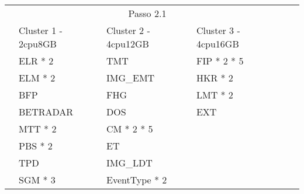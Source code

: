 \begin{table}[H]
  \centering
  \small
  \setlength{\extrarowheight}{3pt}
  \setlength{\arrayrulewidth}{1pt}
  
  \begin{tabular}{|l|l|l|l|l|l|}
    \hline
    \cellcolor{white} & \multicolumn{3}{|c|}{\cellcolor[HTML]{FBE6A3}Passo 2.1} & \cellcolor{white}             & \cellcolor{white}  \\ \cline{2-5} 
                                     & \cellcolor[HTML]{4EAC5B}Cluster 1 - 2cpu8GB & \cellcolor[HTML]{4EAC5B}Cluster 2 - 4cpu12GB & \cellcolor[HTML]{4EAC5B}Cluster 3 - 4cpu16GB &                              & \\ \cline{3-4}
                                     & \cellcolor[HTML]{A9D08E}ELR * 2             & \cellcolor[HTML]{BDD7EE}TMT                & \cellcolor[HTML]{A9D08E}FIP * 2 * 5       &                              & \\ \cline{3-4}
                                     & \cellcolor[HTML]{A9D08E}ELM * 2             & \cellcolor[HTML]{BDD7EE}IMG\_EMT           & \cellcolor[HTML]{A9D08E}HKR * 2           &                              & \\ \cline{3-4}
                                     & \cellcolor[HTML]{A9D08E}BFP                 & \cellcolor[HTML]{BDD7EE}FHG                & \cellcolor[HTML]{BDD7EE}LMT * 2           &                              & \\ \cline{3-4}
                                     & \cellcolor[HTML]{A9D08E}BETRADAR            & \cellcolor[HTML]{BDD7EE}DOS                & \cellcolor[HTML]{BDD7EE}EXT               &                              & \\ \cline{3-4}
                                     & \cellcolor[HTML]{BDD7EE}MTT * 2             & \cellcolor[HTML]{BDD7EE}CM * 2 * 5         &                                           &                              & \\ 
                                     & \cellcolor[HTML]{BDD7EE}PBS * 2             & \cellcolor[HTML]{BDD7EE}ET                 &                                           &                              & \\ 
                                     & \cellcolor[HTML]{BDD7EE}TPD                 & \cellcolor[HTML]{BDD7EE}IMG\_LDT           &                                           &                              & \\ 
                                     & \cellcolor[HTML]{BDD7EE}SGM * 3             & \cellcolor[HTML]{A9D08E}EventType * 2      &            &                              & \\ 

\end{tabular}
\end{table}
